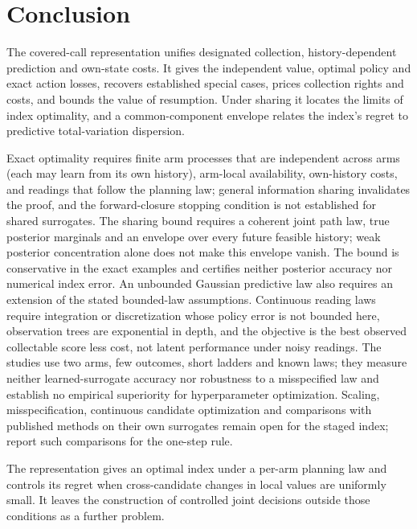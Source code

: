 \section{Conclusion}
\label{sec:limitations}

The covered-call representation unifies designated collection, history-dependent prediction
and own-state costs. It gives the independent value, optimal policy and exact action losses,
recovers established special cases, prices collection rights and costs, and bounds the value of
resumption. Under sharing it locates the limits of index optimality, and a common-component
envelope relates the index's regret to predictive total-variation dispersion.

Exact optimality requires finite arm processes that are independent across arms (each may
learn from its own history), arm-local availability, own-history costs, and readings that follow the
planning law; general information sharing invalidates the proof, and the forward-closure stopping condition is not established for shared surrogates.
The sharing bound requires a coherent joint path law, true posterior
marginals and an envelope over every future feasible history; weak posterior concentration
alone does not make this envelope vanish. The bound is conservative in the exact examples
and certifies neither posterior accuracy nor numerical index error.
An unbounded Gaussian predictive law also requires an extension of the stated
bounded-law assumptions. Continuous
reading laws require integration or discretization whose policy error is not bounded here,
observation trees are exponential in depth, and the objective is the best observed
collectable score less cost, not latent performance under noisy readings. The studies use
two arms, few outcomes, short ladders and known laws; they measure neither learned-surrogate
accuracy nor robustness to a misspecified law and establish no empirical superiority for
hyperparameter optimization. Scaling, misspecification, continuous candidate optimization and
comparisons with published methods on their own surrogates remain open for the staged
index; \citet{vu2026coststop} report such comparisons for the one-step rule.

The representation gives an optimal index under a per-arm planning law and controls its
regret when cross-candidate changes in local values are uniformly small. It leaves the
construction of controlled joint decisions outside those conditions as a further problem.
